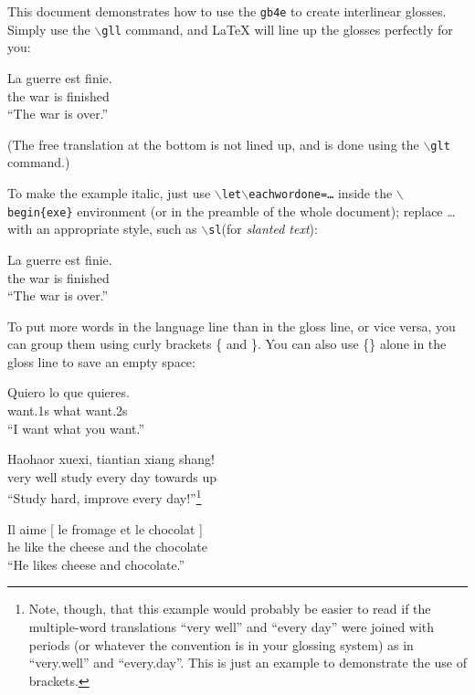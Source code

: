 \documentclass[letterpaper,12pt]{article}
\begin{document}
This document demonstrates how to use the \texttt{gb4e} to create interlinear glosses. Simply use the \texttt{$\backslash$gll} command, and \LaTeX{} will
line up the glosses perfectly for you:
\begin{exe}
\ex
\gll La guerre est finie.\\ %
     the war   is  finished\\
\glt ``The war is over.''
\end{exe}
(The free translation at the bottom is not lined up, and is done using the \texttt{$\backslash$glt} command.)

To make the example italic, just use \texttt{$\backslash$let$\backslash$eachwordone=\ldots} inside the \texttt{$\backslash$begin\{exe\}} environment (or in the preamble of the whole document); replace \ldots with an appropriate style, such as \texttt{$\backslash$sl}(for \textsl{slanted text}):
\begin{exe}
\let\eachwordone=\sl
\ex
\gll La guerre est finie.\\
     the war   is  finished\\
\glt ``The war is over.''
\end{exe}

To put more words in the language line than in the gloss line, or vice versa, you can group them using curly brackets \{ and \}. You can also use \{\} alone in the gloss  line to save an empty space:
\begin{exe}
\let\eachwordone=\sl

\ex 
	\begin{xlist}
	\ex
	\gll Quiero {lo que} quieres.\\
		want.1s what want.2s\\
	\glt ``I want what you want.''

	\ex
	\gll Haohaor xuexi, tiantian xiang shang!\\
		{very well} study {every day} towards up\\
	\glt ``Study hard, improve every day!''\footnote{Note, though, that this example would probably be easier to read if the multiple-word translations ``very well'' and ``every day'' were joined with periods (or whatever the convention is in your glossing system) as in ``very.well'' and ``every.day''. This is just an example to demonstrate the use of brackets.}
	\end{xlist}

\ex
	\begin{xlist}
	\ex
	\gll Il aime \textup{[} le fromage et le chocolat \textup{]}\\
     		he like {} the cheese and the chocolate {}\\
	\glt ``He likes cheese and chocolate.''
	\end{xlist}
\end{exe}
\end{document}
